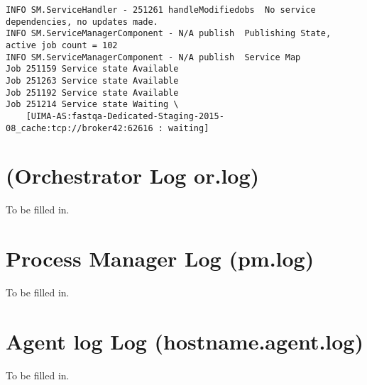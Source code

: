 \begin{verbatim}
INFO SM.ServiceHandler - 251261 handleModifiedobs  No service dependencies, no updates made.
INFO SM.ServiceManagerComponent - N/A publish  Publishing State, active job count = 102
INFO SM.ServiceManagerComponent - N/A publish  Service Map
Job 251159 Service state Available
Job 251263 Service state Available
Job 251192 Service state Available
Job 251214 Service state Waiting \
    [UIMA-AS:fastqa-Dedicated-Staging-2015-08_cache:tcp://broker42:62616 : waiting] 
\end{verbatim}


\section{ (Orchestrator Log or.log)}
    To be filled in.

\section{Process Manager Log (pm.log)}
    To be filled in.

\section{Agent log Log (hostname.agent.log)}
    To be filled in.
